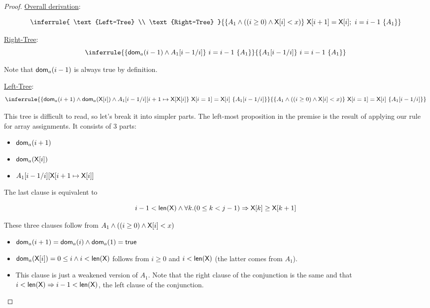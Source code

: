 \begin{enumerate}[(a)]
\begin{enumerate}[i.]
\begin{proof}
        \newcommand{\rightBase}{
            \{ A_1[i - 1/ i] \}
            ~i = i - 1~
            \{ A_1 \}
        }
        \newcommand{\treeBase}{
            \{ A_1 \wedge ((i \geq 0) \wedge {\sf X}[i] < x) \}
            ~\X[i + 1] = \X[i];~i = i - 1~
            \{ A_1 \}
        }

        \underline{Overall derivation}:

        $$ \inferrule{
                \text{Left-Tree}
                \\
                \text{Right-Tree}
            }{\treeBase}
        $$

        \underline{Right-Tree}: \\
        $$ \inferrule{\rightPremise}{\rightBase} $$

        Note that ${\sf dom}_a(i - 1)$ is always true by definition.

        \underline{Left-Tree}:  \\
        $$ \inferrule{\leftPremise}{\leftBase} $$

        This tree is difficult to read, so let's break it into simpler parts.
        The left-most proposition in the premise is the result of applying
        our rule for array assignments. It consists of 3 parts:

        \begin{itemize}
        \item ${\sf dom}_a(i + 1)$
        \item ${\sf dom}_a({\sf X}[i])$
        \item $A_1[i - 1 / i][\textsf{X}[i + 1 \mapsto \textsf{X}[i]]$
        \end{itemize}

        The last clause is equivalent to

        $$ i - 1 < {\sf len(X)} \wedge \forall k. (0 \leq k < j - 1) \Rightarrow \textsf{X}[k] \geq \textsf{X}[k + 1]$$

        These three clauses follow from $ A_1 \wedge ((i \geq 0) \wedge {\sf X}[i] < x) $

        \begin{itemize}
        \item ${\sf dom}_a(i + 1) = {\sf dom}_a(i) \wedge {\sf dom}_a(1) = \textsf{true} $
        \item ${\sf dom}_a({\sf X}[i]) = 0 \leq i \wedge i < \textsf{len}(\textsf{X}) $ follows from
        $i \geq 0$ and $i < \textsf{len}(\textsf{X})$ (the latter comes from $A_1$).
        \item This clause is just a weakened version of $A_1$. Note that the right
        clause of the conjunction is the same and that
        $i < \textsf{len}(\textsf{X}) \Rightarrow i - 1 < \textsf{len}(\textsf{X})$, the left clause of the
        conjunction.


        \end{itemize}




    \end{proof}
    \end{enumerate}


\end{enumerate}
